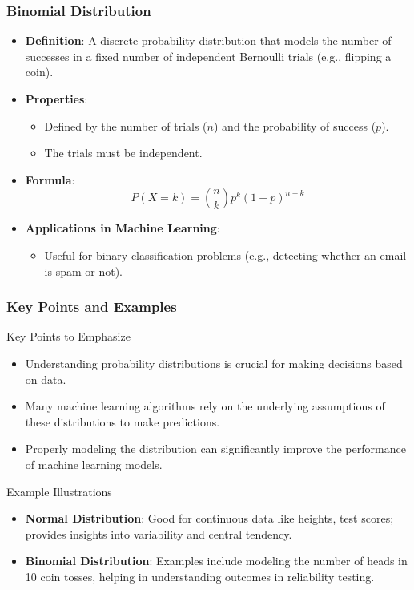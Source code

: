 \documentclass{beamer}
\begin{document}
\begin{frame}[fragile]
    \frametitle{Binomial Distribution}
    \begin{itemize}
        \item \textbf{Definition}: A discrete probability distribution that models the number of successes in a fixed number of independent Bernoulli trials (e.g., flipping a coin).
        
        \item \textbf{Properties}:
        \begin{itemize}
            \item Defined by the number of trials ($n$) and the probability of success ($p$).
            \item The trials must be independent.
        \end{itemize}
        
        \item \textbf{Formula}:
        \begin{equation}
            P(X = k) = \binom{n}{k} p^k (1-p)^{n-k}
        \end{equation}
        
        \item \textbf{Applications in Machine Learning}:
        \begin{itemize}
            \item Useful for binary classification problems (e.g., detecting whether an email is spam or not).
        \end{itemize}
    \end{itemize}
\end{frame}

\begin{frame}[fragile]
    \frametitle{Key Points and Examples}
    \begin{block}{Key Points to Emphasize}
        \begin{itemize}
            \item Understanding probability distributions is crucial for making decisions based on data.
            \item Many machine learning algorithms rely on the underlying assumptions of these distributions to make predictions.
            \item Properly modeling the distribution can significantly improve the performance of machine learning models.
        \end{itemize}
    \end{block}

    \begin{block}{Example Illustrations}
        \begin{itemize}
            \item \textbf{Normal Distribution}: Good for continuous data like heights, test scores; provides insights into variability and central tendency.
            \item \textbf{Binomial Distribution}: Examples include modeling the number of heads in 10 coin tosses, helping in understanding outcomes in reliability testing.
        \end{itemize}
    \end{block}
\end{frame}
\end{document}
